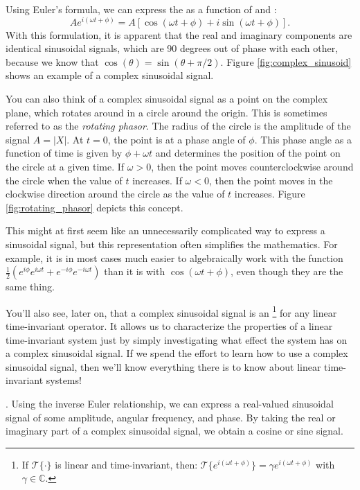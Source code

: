 Using Euler's formula, we can express the 
as a function of \index{$\cos$}{$\cos$} and \index{$\sin$}{$\sin$}:
\begin{equation}
  Ae^{i(\omega t + \phi)}= A[\cos(\omega t + \phi) + i \sin(\omega t + \phi)].
\end{equation}
With this formulation, it is apparent that the real and imaginary components are identical sinusoidal signals,
which are 90 degrees out of phase with each other, because we know that
$\cos(\theta) = \sin(\theta + \pi/2)$. Figure \ref{fig:complex_sinusoid}
shows an example of a complex sinusoidal signal.

You can also think of a complex sinusoidal signal as a point on the complex plane,
which rotates around in a circle around the origin. This is sometimes
referred to as the \emph{rotating phasor}. The radius of the circle is the
amplitude of the signal $A=|X|$. At $t=0$, the point is at a phase angle of $\phi$.
This phase angle as a function of time is given by $\phi + \omega t$ and determines the position
of the point on the circle at a given time. If $\omega>0$, then the point moves counterclockwise
around the circle when the value of $t$ increases. If $\omega < 0$, then the point moves
in the clockwise direction around the circle as the value of $t$ increases.
Figure \ref{fig:rotating_phasor} depicts this concept.

This might at first seem like an unnecessarily complicated way to express a sinusoidal signal,
but this representation often simplifies the mathematics. For example, it is in most cases
much easier to algebraically work with the function
$\frac{1}{2}(e^{i\phi}e^{i\omega t} + e^{-i\phi}e^{-i\omega t})$
than it is with $\cos(\omega t + \phi)$, even though they are the same thing.

You'll also see, later on, that a complex sinusoidal signal is
an \emph{}\footnote{If $\mathcal{T}\{\cdot\}$ is linear and time-invariant, then: $\mathcal{T}\{e^{i(\omega t+\phi)}\}=\gamma e^{i(\omega t+\phi)}$ with $\gamma \in \mathbb{C}$.} for any linear
time-invariant operator. It allows us to characterize the properties of
a linear time-invariant system just by simply investigating what
effect the system has on a complex sinusoidal signal. If we spend the effort
to learn how to use a complex sinusoidal signal, then we'll know everything
there is to know about linear time-invariant systems!

.
Using the inverse Euler relationship, we can express a real-valued sinusoidal signal
of some amplitude, angular frequency, and phase. By taking the real or imaginary part
of a complex sinusoidal signal, we obtain a cosine or sine signal.

